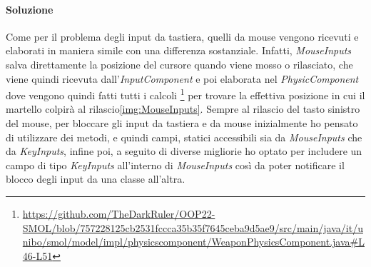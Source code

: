 \documentclass[a4paper,12pt]{report}
\begin{document}
\paragraph{Soluzione}
    Come per il problema degli input da tastiera, quelli da mouse vengono ricevuti e elaborati in maniera simile con una differenza
    sostanziale. Infatti, \emph{MouseInputs} salva direttamente la posizione del cursore
    quando viene mosso o rilasciato, che viene quindi ricevuta dall'\emph{InputComponent} e poi elaborata nel \emph{PhysicComponent} 
    dove vengono quindi fatti tutti i calcoli \footnote{\url{https://github.com/TheDarkRuler/OOP22-SMOL/blob/757228125cb2531fccca35b35f7645ceba9d5ae9/src/main/java/it/unibo/smol/model/impl/physicscomponent/WeaponPhysicsComponent.java#L46-L51}} 
    per trovare la effettiva posizione in cui il martello colpirà al rilascio\ref{img:MouseInputs}. Sempre al rilascio del tasto sinistro del mouse, 
    per bloccare gli input da tastiera e da mouse inizialmente ho pensato di utilizzare dei metodi, e quindi campi, statici 
    accessibili sia da \emph{MouseInputs} che da \emph{KeyInputs}, infine poi, a seguito di diverse migliorie 
    ho optato per includere un campo di tipo \emph{KeyInputs} all'interno di \emph{MouseInputs} così da poter notificare il blocco 
    degli input da una classe all'altra.
\end{document}

